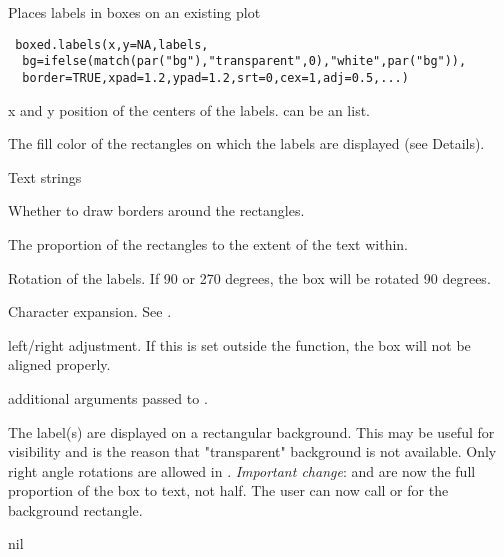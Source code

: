 \begin{Description}\relax
Places labels in boxes on an existing plot
\end{Description}
\begin{Usage}
\begin{verbatim}
 boxed.labels(x,y=NA,labels,
  bg=ifelse(match(par("bg"),"transparent",0),"white",par("bg")),
  border=TRUE,xpad=1.2,ypad=1.2,srt=0,cex=1,adj=0.5,...)
\end{verbatim}
\end{Usage}
\begin{Arguments}
\begin{ldescription}
\item[\code{x,y}] x and y position of the centers of the labels.  can be an
 list.
\item[\code{bg}] The fill color of the rectangles on which the labels are displayed
(see Details).
\item[\code{labels}] Text strings
\item[\code{border}] Whether to draw borders around the rectangles.
\item[\code{xpad,ypad}] The proportion of the rectangles to the
extent of the text within.
\item[\code{srt}] Rotation of the labels. If 90 or 270 degrees, the box will be
rotated 90 degrees.
\item[\code{cex}] Character expansion. See .
\item[\code{adj}] left/right adjustment. If this is set outside the function,
the box will not be aligned properly.
\item[\code{...}] additional arguments passed to .
\end{ldescription}
\end{Arguments}
\begin{Details}\relax
The label(s) are displayed on a rectangular background. This may be useful
for visibility and is the reason that "transparent" background is not available.
Only right angle rotations are allowed in . \emph{Important
change}:  and  are now the full proportion of
the box to text, not half. The user can now call  or
 for the background rectangle.
\end{Details}
\begin{Value}
nil
\end{Value}
